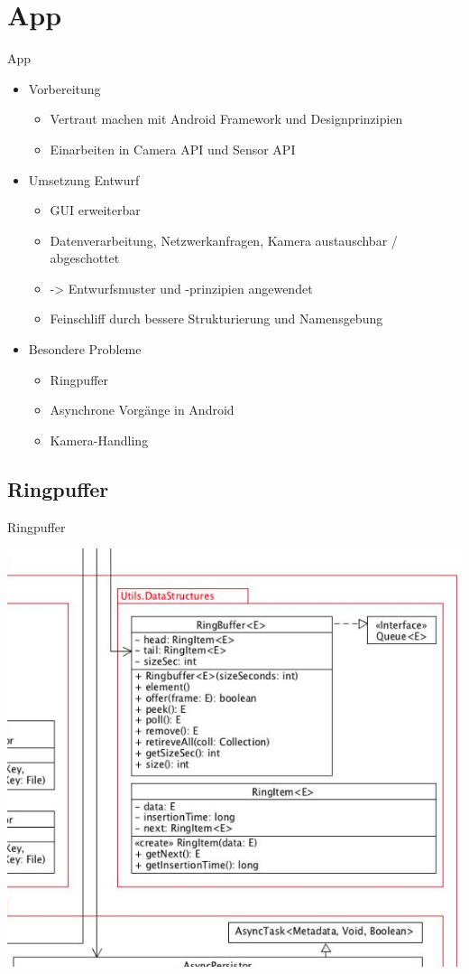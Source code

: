 \documentclass[19pt]{beamer}
\begin{document}
\section{App}
\begin{frame}{App}
	\begin{itemize}
    	\item Vorbereitung
		\begin{itemize}
			\item Vertraut machen mit Android Framework und Designprinzipien
			\pause
			\item Einarbeiten in Camera API und Sensor API
			\pause
		\end{itemize}
		\item Umsetzung Entwurf
		\begin{itemize}
			\item GUI erweiterbar
			\pause
			\item Datenverarbeitung, Netzwerkanfragen, Kamera austauschbar / abgeschottet
			\item -> Entwurfsmuster und -prinzipien angewendet
			\pause
			\item Feinschliff durch bessere Strukturierung und Namensgebung
		\end{itemize}
		\item Besondere Probleme
		\begin{itemize}
			\item Ringpuffer
			\pause
			\item Asynchrone Vorgänge in Android
			\pause 
			\item Kamera-Handling
		\end{itemize}
	\end{itemize}
\end{frame}
\subsection{Ringpuffer}
\begin{frame}{Ringpuffer}
\begin{center}
\includegraphics[scale=0.33]{resources/ringbuffer_old.jpg}
\end{center}
\end{frame}
\end{document}
